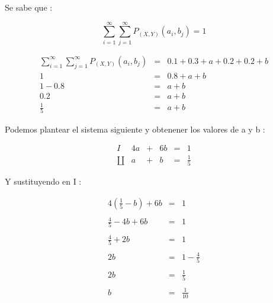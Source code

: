 \documentclass[12pt]{article}
\begin{document}
Se sabe que :

\begin{equation*}
    \sum_{i=1}^{\infty} \sum_{j=1}^{\infty}	P_{\left(X,Y\right)} \left(a_i,b_j\right) = 1
\end{equation*}

\begin{equation*}
    \begin{array}{rcl}
        \sum_{i=1}^{\infty} \sum_{j=1}^{\infty}	P_{\left(X,Y\right)} \left(a_i,b_j\right) & = & 0.1 + 0.3 + a + 0.2 + 0.2 + b
        \\
        1                                                                                & = & 0.8 + a + b
        \\
        1 - 0.8                                                                          & = & a + b
        \\
        0.2                                                                              & = & a + b
        \\
        \frac{1}{5}                                                                      & = & a + b
    \end{array}
\end{equation*}

Podemos plantear el sistema siguiente y obtenener los valores de a y b :

\begin{equation*}
    \begin{array}{rccccl}
        I      & 4a & + & 6b & = & 1
        \\
        \amalg & a  & + & b  & = & \frac{1}{5}
    \end{array}
\end{equation*}

Y sustituyendo en I :

\begin{equation*}
    \begin{array}{rcl}
        4(\frac{1}{5} - b)  +  6b & = & 1
        \\
        \\
        \frac{4}{5} - 4b  +  6b   & = & 1
        \\
        \\
        \frac{4}{5}  +  2b        & = & 1
        \\
        \\
        2b                        & = & 1  -  \frac{4}{5}
        \\
        \\
        2b                        & = & \frac{1}{5}
        \\
        \\
        b                         & = & \frac{1}{10}
    \end{array}
\end{equation*}
\end{document}
